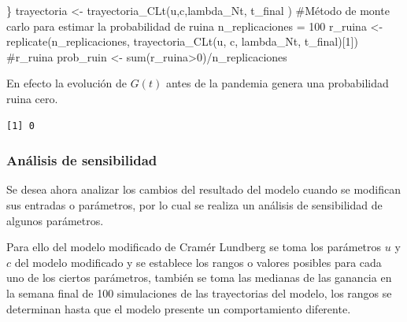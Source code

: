 \documentclass[
  us-letterpaper,
]{scrreprt}
\newenvironment{Shaded}{\begin{snugshade}}{\end{snugshade}}
\newcommand{\CommentTok}[1]{\textcolor[rgb]{0.37,0.37,0.37}{#1}}
\newcommand{\DecValTok}[1]{\textcolor[rgb]{0.68,0.00,0.00}{#1}}
\newcommand{\FunctionTok}[1]{\textcolor[rgb]{0.28,0.35,0.67}{#1}}
\newcommand{\NormalTok}[1]{\textcolor[rgb]{0.00,0.23,0.31}{#1}}
\newcommand{\OtherTok}[1]{\textcolor[rgb]{0.00,0.23,0.31}{#1}}
\newcommand{\SpecialCharTok}[1]{\textcolor[rgb]{0.37,0.37,0.37}{#1}}
\theoremstyle{plain}
\theoremstyle{plain}
\theoremstyle{definition}
\theoremstyle{remark}
\begin{document}
\begin{Shaded}
\begin{Highlighting}[]
\NormalTok{\}}
\NormalTok{trayectoria }\OtherTok{\textless{}{-}} \FunctionTok{trayectoria\_CLt}\NormalTok{(u,c,lambda\_Nt, t\_final )}
\CommentTok{\#Método de monte carlo para estimar la probabilidad de ruina}
\NormalTok{n\_replicaciones }\OtherTok{=} \DecValTok{100}
\NormalTok{r\_ruina }\OtherTok{\textless{}{-}} \FunctionTok{replicate}\NormalTok{(n\_replicaciones, }
            \FunctionTok{trayectoria\_CLt}\NormalTok{(u, c, lambda\_Nt, t\_final)[}\DecValTok{1}\NormalTok{])}
\CommentTok{\#r\_ruina}
\NormalTok{prob\_ruin }\OtherTok{\textless{}{-}} \FunctionTok{sum}\NormalTok{(r\_ruina}\SpecialCharTok{\textgreater{}}\DecValTok{0}\NormalTok{)}\SpecialCharTok{/}\NormalTok{n\_replicaciones}
\end{Highlighting}
\end{Shaded}

En efecto la evolución de \(G(t)\) antes de la pandemia genera una
probabilidad ruina cero.

\begin{verbatim}
[1] 0
\end{verbatim}

\subsubsection{Análisis de
sensibilidad}\label{anuxe1lisis-de-sensibilidad}

Se desea ahora analizar los cambios del resultado del modelo cuando se
modifican sus entradas o parámetros, por lo cual se realiza un análisis
de sensibilidad de algunos parámetros.

Para ello del modelo modificado de Cramér Lundberg se toma los
parámetros \(u\) y \(c\) del modelo modificado y se establece los rangos
o valores posibles para cada uno de los ciertos parámetros, también se
toma las medianas de las ganancia en la semana final de 100 simulaciones
de las trayectorias del modelo, los rangos se determinan hasta que el
modelo presente un comportamiento diferente.
\end{document}
